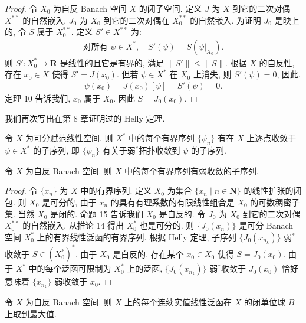 \documentclass[../../main.tex]{subfiles}
\begin{document}
\begin{proof}
令 $X_{0}$ 为自反 Banach 空间 $X$ 的闭子空间. 定义 $J$ 为 $X$ 到它的二次对偶 $X^{**}$ 的自然嵌入. $J_{0}$ 为 $X_{0}$ 到它的二次对偶在 $X_{0}^{**}$ 的自然嵌入. 为证明 $J_{0}$ 是映上的, 令 $S$ 属于 $X_{0}^{**}$. 定义 $S'\in X^{**}$ 为:
\begin{align*}
\text{对所有 }\psi\in X^{*},\quad S'(\psi)=S(\psi|_{X_{0}}).
\end{align*}
则 $S':X_{0}^{*}\to\mathbf{R}$ 是线性的且它是有界的, 满足 $\|S'\|\leqslant\|S\|$. 根据 $X$ 的自反性, 存在 $x_{0}\in X$ 使得 $S'=J(x_{0})$. 但若 $\psi\in X^{*}$ 在 $X_{0}$ 上消失, 则 $S'(\psi)=0$, 因此,
\begin{align*}
\psi(x_{0})=J(x_{0})[\psi]=S'(\psi)=0.
\end{align*}
定理 10 告诉我们, $x_{0}$ 属于 $X_{0}$. 因此 $S=J_{0}(x_{0})$.
\end{proof}

我们再次写出在第 8 章证明过的 Helly 定理.

\begin{theorem}[Helly 定理]\label{theorem:ch14-Helly}
令 $X$ 为可分赋范线性空间. 则 $X^{*}$ 中的每个有界序列 $\{\psi_{n}\}$ 有在 $X$ 上逐点收敛于 $\psi\in X^{*}$ 的子序列, 即 $\{\psi_{n}\}$ 有关于弱$^{*}$拓扑收敛到 $\psi$ 的子序列.
\end{theorem}

\begin{theorem}\label{theorem:ch14-自反弱序列紧}
令 $X$ 为自反 Banach 空间. 则 $X$ 中的每个有界序列有弱收敛的子序列.
\end{theorem}

\begin{proof}
令 $\{x_{n}\}$ 为 $X$ 中的有界序列. 定义 $X_{0}$ 为集合 $\{x_{n}\mid n\in\mathbf{N}\}$ 的线性扩张的闭包. 则 $X_{0}$ 是可分的, 由于 $x_{n}$ 的具有有理系数的有限线性组合是 $X_{0}$ 的可数稠密子集. 当然 $X_{0}$ 是闭的. 命题 15 告诉我们 $X_{0}$ 是自反的. 令 $J_{0}$ 为 $X_{0}$ 到它的二次对偶 $X_{0}^{**}$ 的自然嵌入. 从推论 14 得出 $X_{0}^{*}$ 也是可分的. 则 $\{J_{0}(x_{n})\}$ 是可分 Banach 空间 $X_{0}^{*}$ 上的有界线性泛函的有界序列. 根据 Helly 定理, 子序列 $\{J_{0}(x_{n_{k}})\}$ 弱$^{*}$收敛于 $S\in(X_{0}^{*})^{*}$. 由于 $X_{0}$ 是自反的, 存在某个 $x_{0}\in X_{0}$ 使得 $S=J_{0}(x_{0})$. 由于 $X^{*}$ 中的每个泛函可限制为 $X_{0}^{*}$ 上的泛函, $\{J_{0}(x_{n_{k}})\}$ 弱$^{*}$收敛于 $J_{0}(x_{0})$ 恰好意味着 $\{x_{n_{k}}\}$ 弱收敛于 $x_{0}$.
\end{proof}

\begin{corollary}\label{corollary:ch14-自反取最大}
令 $X$ 为自反 Banach 空间. 则 $X$ 上的每个连续实值线性泛函在 $X$ 的闭单位球 $B$ 上取到最大值.
\end{corollary}
\end{document}
